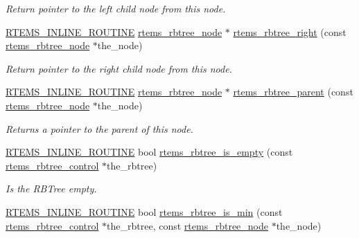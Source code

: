 \begin{DoxyCompactItemize}
\begin{DoxyCompactList}\small\item\em Return pointer to the left child node from this node. \end{DoxyCompactList}\item 
\mbox{\hyperlink{group__RTEMSScoreBaseDefs_gac216239df231d5dbd15e3520b0b9313f}{R\+T\+E\+M\+S\+\_\+\+I\+N\+L\+I\+N\+E\+\_\+\+R\+O\+U\+T\+I\+NE}} \mbox{\hyperlink{group__ClassicRBTrees_gaef47fc7fc61856c9afbf7f18a26ff80d}{rtems\+\_\+rbtree\+\_\+node}} $\ast$ \mbox{\hyperlink{group__ClassicRBTrees_gaf3348775c30f53b13e2ddb1c14f039bf}{rtems\+\_\+rbtree\+\_\+right}} (const \mbox{\hyperlink{group__ClassicRBTrees_gaef47fc7fc61856c9afbf7f18a26ff80d}{rtems\+\_\+rbtree\+\_\+node}} $\ast$the\+\_\+node)
\begin{DoxyCompactList}\small\item\em Return pointer to the right child node from this node. \end{DoxyCompactList}\item 
\mbox{\hyperlink{group__RTEMSScoreBaseDefs_gac216239df231d5dbd15e3520b0b9313f}{R\+T\+E\+M\+S\+\_\+\+I\+N\+L\+I\+N\+E\+\_\+\+R\+O\+U\+T\+I\+NE}} \mbox{\hyperlink{group__ClassicRBTrees_gaef47fc7fc61856c9afbf7f18a26ff80d}{rtems\+\_\+rbtree\+\_\+node}} $\ast$ \mbox{\hyperlink{group__ClassicRBTrees_ga78ab85b5893639aba788eac56a2c4b83}{rtems\+\_\+rbtree\+\_\+parent}} (const \mbox{\hyperlink{group__ClassicRBTrees_gaef47fc7fc61856c9afbf7f18a26ff80d}{rtems\+\_\+rbtree\+\_\+node}} $\ast$the\+\_\+node)
\begin{DoxyCompactList}\small\item\em Returns a pointer to the parent of this node. \end{DoxyCompactList}\item 
\mbox{\hyperlink{group__RTEMSScoreBaseDefs_gac216239df231d5dbd15e3520b0b9313f}{R\+T\+E\+M\+S\+\_\+\+I\+N\+L\+I\+N\+E\+\_\+\+R\+O\+U\+T\+I\+NE}} bool \mbox{\hyperlink{group__ClassicRBTrees_ga8b5daa460162f4fc1ca441a1f1c31f10}{rtems\+\_\+rbtree\+\_\+is\+\_\+empty}} (const \mbox{\hyperlink{group__ClassicRBTrees_ga21fe446d0b3cb8b25c814e93357753ef}{rtems\+\_\+rbtree\+\_\+control}} $\ast$the\+\_\+rbtree)
\begin{DoxyCompactList}\small\item\em Is the R\+B\+Tree empty. \end{DoxyCompactList}\item 
\mbox{\hyperlink{group__RTEMSScoreBaseDefs_gac216239df231d5dbd15e3520b0b9313f}{R\+T\+E\+M\+S\+\_\+\+I\+N\+L\+I\+N\+E\+\_\+\+R\+O\+U\+T\+I\+NE}} bool \mbox{\hyperlink{group__ClassicRBTrees_gab52a8561fdde5d8722a156075963d9f7}{rtems\+\_\+rbtree\+\_\+is\+\_\+min}} (const \mbox{\hyperlink{group__ClassicRBTrees_ga21fe446d0b3cb8b25c814e93357753ef}{rtems\+\_\+rbtree\+\_\+control}} $\ast$the\+\_\+rbtree, const \mbox{\hyperlink{group__ClassicRBTrees_gaef47fc7fc61856c9afbf7f18a26ff80d}{rtems\+\_\+rbtree\+\_\+node}} $\ast$the\+\_\+node)

\end{DoxyCompactItemize}
